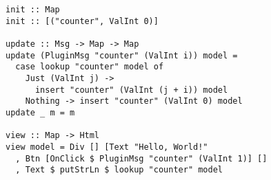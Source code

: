 \begin{verbatim}
init :: Map
init :: [("counter", ValInt 0)]

update :: Msg -> Map -> Map
update (PluginMsg "counter" (ValInt i)) model =
  case lookup "counter" model of
    Just (ValInt j) ->
      insert "counter" (ValInt (j + i)) model
    Nothing -> insert "counter" (ValInt 0) model
update _ m = m

view :: Map -> Html
view model = Div [] [Text "Hello, World!"
  , Btn [OnClick $ PluginMsg "counter" (ValInt 1)] []
  , Text $ putStrLn $ lookup "counter" model
\end{verbatim}


